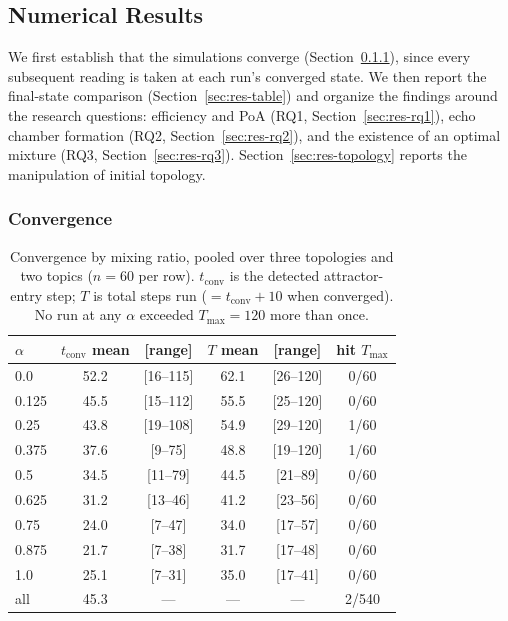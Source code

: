 \begingroup\color{revgreen}

\subsection{Numerical Results}
\label{sec:results}

We first establish that the simulations converge (Section~\ref{sec:res-conv}), since
every subsequent reading is taken at each run's converged state. We then report the
final-state comparison (Section~\ref{sec:res-table}) and organize the findings around the
research questions: efficiency and PoA (RQ1, Section~\ref{sec:res-rq1}), echo chamber
formation (RQ2, Section~\ref{sec:res-rq2}), and the existence of an optimal mixture
(RQ3, Section~\ref{sec:res-rq3}). Section~\ref{sec:res-topology} reports the manipulation
of initial topology.

\subsubsection{Convergence}
\label{sec:res-conv}

\begin{table}[t]
\centering
\caption{Convergence by mixing ratio, pooled over three topologies and two topics
($n = 60$ per row). $t_{\mathrm{conv}}$ is the detected attractor-entry step;
$T$ is total steps run ($= t_{\mathrm{conv}} + 10$ when converged). No run at any
$\alpha$ exceeded $T_{\max} = 120$ more than once.}
\label{tab:convergence}
\begin{tabular}{lccccc}
\toprule
$\alpha$ & $t_{\mathrm{conv}}$ mean & [range] & $T$ mean & [range] & hit $T_{\max}$ \\
\midrule
0.0   & 52.2 & [16--115] & 62.1 & [26--120] & 0/60 \\
0.125 & 45.5 & [15--112] & 55.5 & [25--120] & 0/60 \\
0.25  & 43.8 & [19--108] & 54.9 & [29--120] & 1/60 \\
0.375 & 37.6 & [9--75]   & 48.8 & [19--120] & 1/60 \\
0.5   & 34.5 & [11--79]  & 44.5 & [21--89]  & 0/60 \\
0.625 & 31.2 & [13--46]  & 41.2 & [23--56]  & 0/60 \\
0.75  & 24.0 & [7--47]   & 34.0 & [17--57]  & 0/60 \\
0.875 & 21.7 & [7--38]   & 31.7 & [17--48]  & 0/60 \\
1.0   & 25.1 & [7--31]   & 35.0 & [17--41]  & 0/60 \\
\midrule
all   & 45.3 & --- & --- & --- & 2/540 \\
\bottomrule
\end{tabular}
\end{table}

